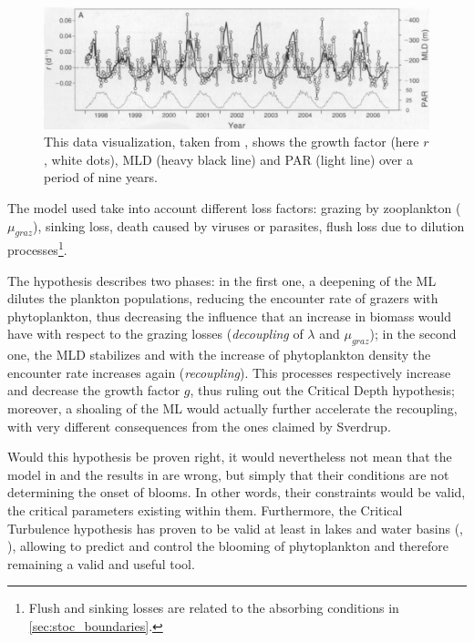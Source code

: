 \begin{figure} [H]
    \includegraphics[width=\textwidth]{img/references/behrenfeld2010r}
    \caption{This data visualization, taken from \autocite{Behrenfeld2010AbandoningBlooms}, shows the growth factor (here $r$, white dots), MLD (heavy black line) and PAR (light line) over a period of nine years.}
    \label{fig:behrenfeld2010r}
\end{figure}

The model used take into account different loss factors: grazing by zooplankton ($\mu_{graz}$), sinking loss, death caused by viruses or parasites, flush loss due to dilution processes\footnote{Flush and sinking losses are related to the absorbing conditions in \autoref{sec:stoc_boundaries}.}.

The hypothesis describes two phases: in the first one, a deepening of the ML dilutes the plankton populations, reducing the encounter rate of grazers with phytoplankton, thus decreasing the influence that an increase in biomass would have with respect to the grazing losses (\textit{decoupling} of $\lambda$ and $\mu_{graz}$); in the second one, the MLD stabilizes and with the increase of phytoplankton density the encounter rate increases again (\textit{recoupling}). This processes respectively increase and decrease the growth factor $g$, thus ruling out the Critical Depth hypothesis; moreover, a shoaling of the ML would actually further accelerate the recoupling, with very different consequences from the ones claimed by Sverdrup.

Would this hypothesis be proven right, it would nevertheless not mean that the model in \autocite{Shigesada1981AnalysisWaters} and the results in \autocite{Huisman2002HowPersist} are wrong, but simply that their conditions are not determining the onset of blooms. In other words, their constraints would be valid, the critical parameters existing within them. Furthermore, the Critical Turbulence hypothesis has proven to be valid at least in lakes and water basins (\autocite{Visser2016ArtificialReview}, \autocite{Huisman2004ChangesSpecies}), allowing to predict and control the blooming of phytoplankton and therefore remaining a valid and useful tool.